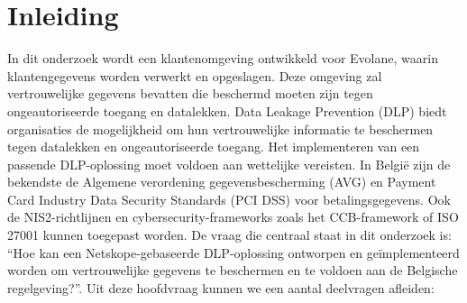 


% 

\section{Inleiding}%
\label{sec:inleiding}

In dit onderzoek wordt een klantenomgeving ontwikkeld voor Evolane, waarin klantengegevens worden verwerkt en opgeslagen. Deze omgeving zal vertrouwelijke gegevens bevatten die beschermd moeten zijn tegen ongeautoriseerde toegang en datalekken. Data Leakage Prevention (DLP) biedt organisaties de mogelijkheid om hun vertrouwelijke informatie te beschermen tegen datalekken en ongeautoriseerde toegang. Het implementeren van een passende DLP-oplossing moet voldoen aan wettelijke vereisten. In België zijn de bekendste de Algemene verordening gegevensbescherming (AVG) en Payment Card Industry Data Security Standards (PCI DSS) voor betalingsgegevens. Ook de NIS2-richtlijnen en cybersecurity-frameworks zoals het CCB-framework of ISO 27001 kunnen  toegepast worden.
De vraag die centraal staat in dit onderzoek is: “Hoe kan een Netskope-gebaseerde DLP-oplossing ontworpen en geïmplementeerd worden om vertrouwelijke gegevens te beschermen en te voldoen aan de Belgische regelgeving?”. Uit deze hoofdvraag kunnen we een aantal deelvragen afleiden:

